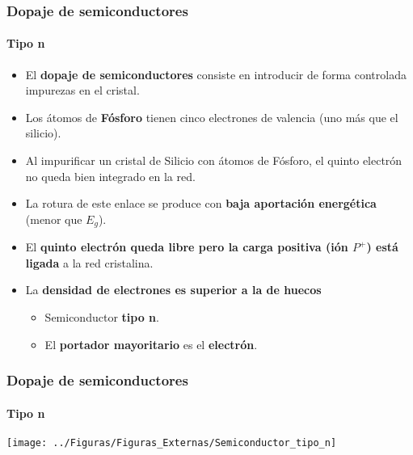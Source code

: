 \documentclass[xcolor=dvipsnames]{beamer}
\begin{document}
\begin{frame}
  \frametitle{Dopaje de semiconductores}
  \framesubtitle{Tipo n}

  \begin{itemize}
  \item El \textbf{dopaje de semiconductores} consiste en introducir
    de forma controlada impurezas en el cristal.
  \item Los átomos de\textbf{ Fósforo} tienen cinco electrones de
    valencia (uno más que el silicio).
  \item Al impurificar un cristal de Silicio con átomos de Fósforo, el
    quinto electrón no queda bien integrado en la red.
  \item La rotura de este enlace se produce con \textbf{baja
      aportación energética} (menor que $E_{g}$).
  \item El \textbf{quinto electrón queda libre pero la carga positiva
      (ión $P^{+}$) está ligada} a la red cristalina.
  \item La \textbf{densidad de electrones es superior a la de huecos}

    \begin{itemize}
    \item Semiconductor \textbf{tipo n}.
    \item El \textbf{portador mayoritario} es el \textbf{electrón}.
    \end{itemize}
  \end{itemize}

\end{frame}

\begin{frame}
  \frametitle{Dopaje de semiconductores}
  \framesubtitle{Tipo n}

  \begin{center}
    \texttt{[image: ../Figuras/Figuras\_Externas/Semiconductor\_tipo\_n]}
    \par\end{center}

\end{frame}
\end{document}
